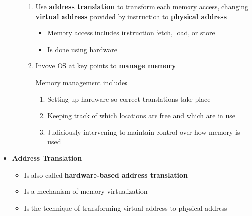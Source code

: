 \documentclass[12pt]{article}
\begin{document}
\begin{itemize}
\begin{itemize}
        \begin{enumerate}[1.]
            \item Use \textbf{address translation} to transform each memory access,
            changing \textbf{virtual address} provided by instruction to \textbf{physical address}
            \begin{itemize}
                \item Memory access includes instruction fetch, load, or store
                \item Is done using hardware
            \end{itemize}
            \item Invove OS at key points to \textbf{manage memory}

            \bigskip

            Memory management includes

            \bigskip

            \begin{enumerate}[1.]
                \item Setting up hardware so correct translations take place
                \item Keeping track of which locations are free and which are in use
                \item Judiciously intervening to maintain control over how memory is used
            \end{enumerate}

            \bigskip
        \end{enumerate}
    \end{itemize}

    \item \textbf{Address Translation}

    \begin{itemize}
        \item Is also called \textbf{hardware-based address translation}
        \item Is a mechanism of memory virtualization
        \item Is the technique of transforming virtual address to physical address
    \end{itemize}




\end{itemize}
\end{document}
